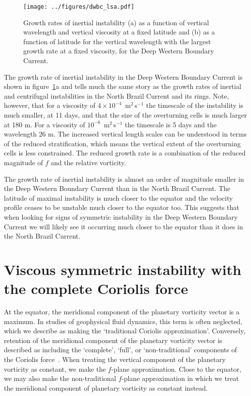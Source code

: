 \begin{figure}[t]
    \centering
    \texttt{[image: ../figures/dwbc\_lsa.pdf]}
    \caption{Growth rates of inertial instability (a) as a function of vertical wavelength and vertical viscosity at a fixed latitude and (b) as a function of latitude for the vertical wavelength with the largest growth rate at a fixed viscosity, for the Deep Western Boundary Current.}
    \label{fig:lsaDWBC}
\end{figure}

The growth rate of inertial instability in the Deep Western Boundary Current is shown in figure~\ref{fig:lsaDWBC}a and tells much the same story as the growth rates of inertial and centrifugal instabilities in the North Brazil Current and its rings. Note, however, that for a viscosity of $4 \times 10^{-4}$~m$^2\,$s$^{-1}$ the timescale of the instability is much smaller, at 11 days, and that the size of the overturning cells is much larger at 180 m. For a viscosity of $10^{-6}$~m$^2\,$s$^{-1}$ the timescale is 5 days and the wavelength 26 m. The increased vertical length scales can be understood in terms of the reduced stratification, which means the vertical extent of the overturning cells is less constrained. The reduced growth rate is a combination of the reduced magnitude of $f$ and the relative vorticity.

The growth rate of inertial instability is almost an order of magnitude smaller in the Deep Western Boundary Current than in the North Brazil Current. The latitude of maximal instability is much closer to the equator and the velocity profile ceases to be unstable much closer to the equator too. This suggests that when looking for signs of symmetric instability in the Deep Western Boundary Current we will likely see it occurring much closer to the equator than it does in the North Brazil Current.

\section{Viscous symmetric instability with the complete Coriolis force}
\label{sec:DrasticSI}
    At the equator, the meridional component of the planetary vorticity vector is a maximum. In studies of geophysical fluid dynamics, this term is often neglected, which we describe as making the `traditional Coriolis approximation'. Conversely, retention of the meridional component of the planetary vorticity vector is described as including the `complete', `full', or `non-traditional' components of the Coriolis force~\citep{Stewart2011}. When treating the vertical component of the planetary vorticity as constant, we make the $f$-plane approximation. Close to the equator, we may also make the non-traditional $f$-plane approximation in which we treat the meridional component of planetary vorticity as constant instead.


